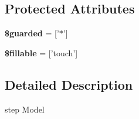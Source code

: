 \subsection*{Protected Attributes}
\begin{DoxyCompactItemize}
\item 
\hypertarget{classDMA_1_1Friends_1_1Models_1_1Step_af8869edae9bea05ac3bc966d9b7debfe}{{\bfseries \$guarded} = \mbox{[}'$\ast$'\mbox{]}}\label{classDMA_1_1Friends_1_1Models_1_1Step_af8869edae9bea05ac3bc966d9b7debfe}

\item 
\hypertarget{classDMA_1_1Friends_1_1Models_1_1Step_a21b083b38af6692f21ae0827eea458a0}{{\bfseries \$fillable} = \mbox{[}'touch'\mbox{]}}\label{classDMA_1_1Friends_1_1Models_1_1Step_a21b083b38af6692f21ae0827eea458a0}

\end{DoxyCompactItemize}


\subsection{Detailed Description}
step Model 

